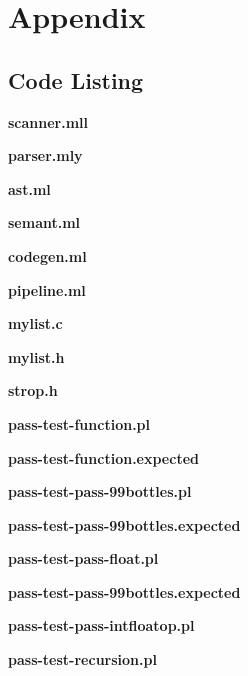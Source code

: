 \documentclass[./Report_main.tex]{subfiles}
\begin{document}


\chapter{Appendix}
\section*{Code Listing}
\textbf{scanner.mll}

\textbf{parser.mly}

\textbf{ast.ml}

\textbf{semant.ml}

\textbf{codegen.ml}

\textbf{pipeline.ml}

\textbf{mylist.c}

\textbf{mylist.h}

\textbf{strop.h}

\textbf{pass-test-function.pl}

\textbf{pass-test-function.expected}

\textbf{pass-test-pass-99bottles.pl}

\textbf{pass-test-pass-99bottles.expected}

\textbf{pass-test-pass-float.pl}

\textbf{pass-test-pass-99bottles.expected}

\textbf{pass-test-pass-intfloatop.pl}

\textbf{pass-test-recursion.pl}



\end{document}
